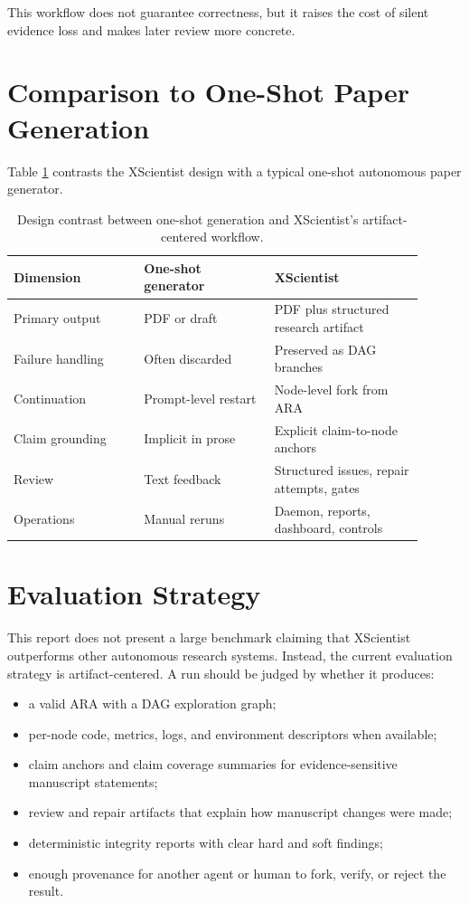 \documentclass[11pt]{article}
\begin{document}
This workflow does not guarantee correctness, but it raises the cost of
silent evidence loss and makes later review more concrete.

\section{Comparison to One-Shot Paper Generation}

Table \ref{tab:comparison} contrasts the XScientist design with a typical
one-shot autonomous paper generator.

\begin{table}[t]
\centering
\begin{tabular}{p{0.29\linewidth}p{0.29\linewidth}p{0.32\linewidth}}
\toprule
Dimension & One-shot generator & XScientist \\
\midrule
Primary output & PDF or draft & PDF plus structured research artifact \\
Failure handling & Often discarded & Preserved as DAG branches \\
Continuation & Prompt-level restart & Node-level fork from ARA \\
Claim grounding & Implicit in prose & Explicit claim-to-node anchors \\
Review & Text feedback & Structured issues, repair attempts, gates \\
Operations & Manual reruns & Daemon, reports, dashboard, controls \\
\bottomrule
\end{tabular}
\caption{Design contrast between one-shot generation and XScientist's
artifact-centered workflow.}
\label{tab:comparison}
\end{table}

\section{Evaluation Strategy}

This report does not present a large benchmark claiming that XScientist
outperforms other autonomous research systems. Instead, the current evaluation
strategy is artifact-centered. A run should be judged by whether it produces:

\begin{itemize}[leftmargin=*]
  \item a valid ARA with a DAG exploration graph;
  \item per-node code, metrics, logs, and environment descriptors when
  available;
  \item claim anchors and claim coverage summaries for evidence-sensitive
  manuscript statements;
  \item review and repair artifacts that explain how manuscript changes were
  made;
  \item deterministic integrity reports with clear hard and soft findings;
  \item enough provenance for another agent or human to fork, verify, or
  reject the result.
\end{itemize}
\end{document}
